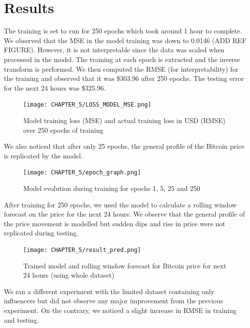 \section{Results}
The training is set to run for 250 epochs which took around 1 hour to complete. We observed that the MSE in the model training was down to 0.0146 (ADD REF FIGURE). However, it is not interpretable since the data was scaled when processed in the model. The training at each epoch is extracted and the inverse transform is performed. We then computed the RMSE (for interpretability) for the training and observed that it was \$303.96 after 250 epochs. The testing error for the next 24 hours was \$325.96.  
\begin{figure}[H]
   \centering
   \texttt{[image: CHAPTER\_5/LOSS\_MODEL\_MSE.png]}
   \caption{Model training loss (MSE) and actual training loss in USD (RMSE) over 250 epochs of training}
   \label{training_loss}
\end{figure}
\noindent We also noticed that after only 25 epochs, the general profile of the Bitcoin price is replicated by the model.
 \begin{figure}[H]
    \centering
    \texttt{[image: CHAPTER\_5/epoch\_graph.png]}
    \caption{Model evolution during training for epochs 1, 5, 25 and 250}
    \label{epoch_graph}
 \end{figure}
\noindent After training for 250 epochs, we used the model to calculate a rolling window forecast on the price for the next 24 hours. We observe that the general profile of the price movement is modelled but sudden dips and rise in price were not replicated during testing.
\begin{figure}[H]
   \centering
   \texttt{[image: CHAPTER\_5/result\_pred.png]}
   \caption{Trained model and rolling window forecast for Bitcoin price for next 24 hours (using whole dataset)}
   \label{result_pred}
\end{figure}
\noindent We ran a different experiment with the limited dataset containing only influencers but did not observe any major improvement from the previous experiment. On the contrary, we noticed a slight increase in RMSE in training and testing. \vspace{5mm}

